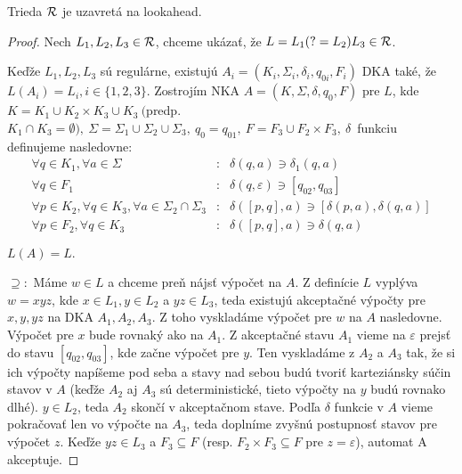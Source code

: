 \begin{lema}
Trieda ${\cal R}$ je uzavretá na lookahead.
\end{lema}
\begin{proof}
Nech $ L_{1}, L_{2}, L_{3} \in {\cal R} $, chceme ukázať, že  $ L = L_{1}(?=L_{2})L_{3} \in {\cal R} $.

Keďže $ L_{1},L_{2},L_{3} $ sú regulárne, existujú $ A_{i} = (K_{i},\Sigma_{i},\delta_{i},q_{0i},F_{i}) $ DKA také, že $ L(A_{i})=L_{i}, i \in \lbrace 1,2,3\rbrace $. Zostrojím NKA $ A = (K,\Sigma,\delta,q_{0},F) $ pre $L$, kde
$ K = K_{1} \cup K_{2} \times K_{3} \cup K_{3} ~ ( $predp. $ K_{1} \cap K_{3}= \emptyset), ~
\Sigma=\Sigma_{1}\cup\Sigma_{2}\cup\Sigma_{3}, ~ q_{0}=q_{01}, ~ F = F_{3} \cup F_{2} \times F_{3}, ~ \delta $~funkciu definujeme nasledovne:
\begin{eqnarray*}
\forall q \in K_{1}, \forall a \in \Sigma &:& \delta(q,a) \ni \delta_{1}(q,a) \\
\forall q \in F_{1} &:& \delta(q,\varepsilon ) \ni \left[ q_{02},q_{03} \right] \\
\forall p \in K_{2}, \forall q \in K_{3}, \forall a \in \Sigma_{2} \cap \Sigma_{3} &:& \delta( \left[ p,q \right] ,a) \ni \left[ \delta(p,a), \delta (q,a) \right] \\
\forall p \in F_2, \forall q \in K_3 &:& \delta(\left[p,q\right],a) \ni \delta(q,a) 
\end{eqnarray*}

$ L(A) = L. $

$ \supseteq: $ Máme $ w \in L $ a chceme preň nájsť výpočet na $A$. Z definície $L$ vyplýva $w=xyz$, kde $x \in L_1, y \in L_2$ a $yz \in L_3$, teda existujú akceptačné výpočty pre $x,y,yz$ na DKA $A_1,A_2,A_3$. Z toho vyskladáme výpočet pre $w$ na $A$ nasledovne. Výpočet pre $x$ bude rovnaký ako na $A_1$. Z akceptačné stavu $A_1$ vieme na $\varepsilon$ prejsť do stavu $\left[q_{02},q_{03}\right]$, kde začne výpočet pre $y$. Ten vyskladáme z $A_2$ a $A_3$ tak, že si ich výpočty napíšeme pod seba a stavy nad sebou budú tvoriť karteziánsky súčin stavov v $A$ (keďže $A_2$ aj $A_3$ sú deterministické, tieto výpočty na $y$ budú rovnako dlhé). $y \in L_2$, teda $A_2$ skončí v akceptačnom stave. Podľa $\delta$ funkcie v $A$ vieme pokračovať len vo výpočte na $A_3$, teda doplníme zvyšnú postupnosť stavov pre výpočet $z$. Keďže $yz \in L_3$ a $F_3\subseteq F$ (resp. $F_2\times F_3\subseteq F$ pre $z=\varepsilon$), automat A akceptuje. 


\end{proof}
